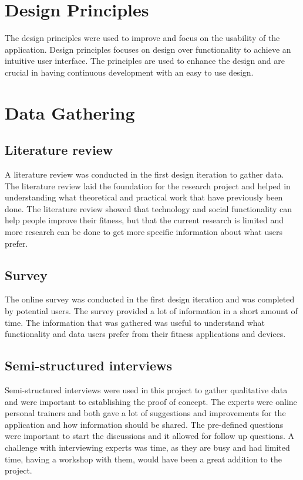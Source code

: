 \section{Design Principles}
The design principles were used to improve and focus on the usability of the application. Design principles focuses on design over functionality to achieve an intuitive user interface. The principles are used to enhance the design and are crucial in having continuous development with an easy to use design.

\section{Data Gathering}

\subsection{Literature review}
A literature review was conducted in the first design iteration to gather data. The literature review laid the foundation for the research project and helped in understanding what theoretical and practical work that have previously been done. The literature review showed that technology and social functionality can help people improve their fitness, but that the current research is limited and more research can be done to get more specific information about what users prefer. 
\subsection{Survey}
The online survey was conducted in the first design iteration and was completed by potential users. The survey provided a lot of information in a short amount of time. The information that was gathered was useful to understand what functionality and data users prefer from their fitness applications and devices.
\subsection{Semi-structured interviews}
Semi-structured interviews were used in this project to gather qualitative data and were important to establishing the proof of concept. The experts were online personal trainers and both gave a lot of suggestions and improvements for the application and how information should be shared. The pre-defined questions were important to start the discussions and it allowed for follow up questions. A challenge with interviewing experts was time, as they are busy and had limited time, having a workshop with them, would have been a great addition to the project.


